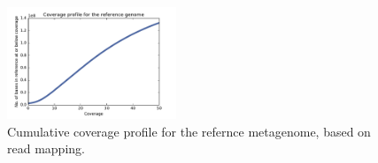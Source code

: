 \documentclass[11pt]{article}
\begin{document}

 
\begin{figure}[!h]
\centering
\includegraphics[width=0.45\textwidth]{CoverageProfile.pdf}  
\caption{\label{fig:coverage-profile} Cumulative coverage profile for the refernce metagenome, based on read mapping. }
\end{figure}







\end{document}
